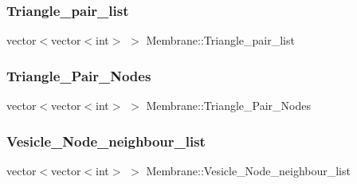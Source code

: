 \subsubsection{\texorpdfstring{Triangle\_pair\_list}{Triangle\_pair\_list}}
{\footnotesize\ttfamily vector$<$vector$<$int$>$ $>$ Membrane\+::\+Triangle\+\_\+pair\+\_\+list}

\mbox{\label{classMembrane_a16c7d8283b2b53178f1c0c8c8a3fe0cf}} 
\subsubsection{\texorpdfstring{Triangle\_Pair\_Nodes}{Triangle\_Pair\_Nodes}}
{\footnotesize\ttfamily vector$<$vector$<$int$>$ $>$ Membrane\+::\+Triangle\+\_\+\+Pair\+\_\+\+Nodes}

\mbox{\label{classMembrane_a7ce2c0484a3943de93d299137d709738}} 
\subsubsection{\texorpdfstring{Vesicle\_Node\_neighbour\_list}{Vesicle\_Node\_neighbour\_list}}
{\footnotesize\ttfamily vector$<$vector$<$int$>$ $>$ Membrane\+::\+Vesicle\+\_\+\+Node\+\_\+neighbour\+\_\+list}



